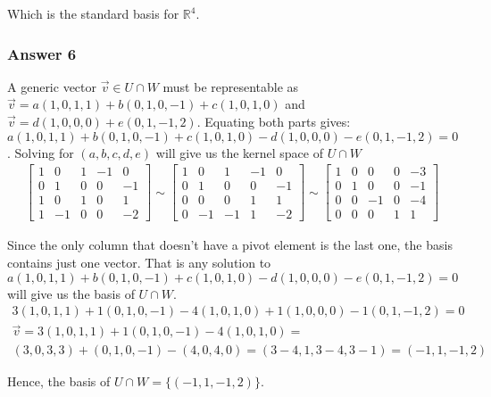 \documentclass[11pt]{article}
\begin{document}
Which is the standard basis for $\mathbb{R}^4$.

\subsubsection{Answer 6}
\label{sec-1-2-3}
A generic vector $\vec{v} \in U \cap W$ must be representable as $\vec{v} =
    a(1,0,1,1) + b(0,1,0,-1) + c(1,0,1,0)$ and $\vec{v} = d(1,0,0,0) +
    e(0,1,-1,2)$.  Equating both parts gives: $a(1,0,1,1) + b(0,1,0,-1) +
    c(1,0,1,0) - d(1,0,0,0) - e(0,1,-1,2) = 0$.  Solving for $(a, b, c, d, e)$
will give us the kernel space of $U \cap W$
\begin{align*}
  \begin{bmatrix}
    1 & 0  & 1 & -1 & 0 \\
    0 & 1  & 0 & 0  & -1 \\ 
    1 & 0  & 1 & 0  & 1 \\
    1 & -1 & 0 & 0  & -2 
  \end{bmatrix} \sim
  \begin{bmatrix}
    1 & 0  & 1  & -1 & 0 \\
    0 & 1  & 0  & 0  & -1 \\ 
    0 & 0  & 0  & 1  & 1 \\
    0 & -1 & -1 & 1  & -2 
  \end{bmatrix} \sim
  \begin{bmatrix}
    1 & 0 & 0  & 0 & -3 \\
    0 & 1 & 0  & 0  & -1 \\ 
    0 & 0 & -1 & 0  & -4 \\ 
    0 & 0 & 0  & 1  & 1
  \end{bmatrix}
\end{align*}

Since the only column that doesn't have a pivot element is the last one, the
basis contains just one vector.  That is any solution to $a(1,0,1,1) +
    b(0,1,0,-1) + c(1,0,1,0) - d(1,0,0,0) - e(0,1,-1,2) = 0$ will give us the
basis of $U \cap W$.
\begin{align*}
  3(1,0,1,1) + 1(0,1,0,-1) - 4(1,0,1,0) + 1(1,0,0,0) - 1(0,1,-1,2) = 0 \\
  \vec{v} = 3(1,0,1,1) + 1(0,1,0,-1) - 4(1,0,1,0) = \\
  (3,0,3,3) + (0,1,0,-1) - (4,0,4,0) = (3-4,1,3-4,3-1) = (-1,1,-1,2)
\end{align*}

Hence, the basis of $U \cap W = \{(-1,1,-1,2)\}$.
\end{document}
